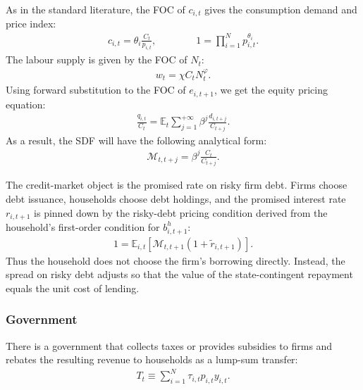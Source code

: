 \documentclass[12pt]{article}
\numberwithin{equation}{section}
\begin{document}
As in the standard literature, the FOC of $c_{i,t}$ gives the consumption demand and price index:
\begin{align*}
    c_{i,t}
    =
    \theta_i\frac{C_t}{p_{i,t}},
    \qquad \qquad
    1
    =
    \prod_{i=1}^N p_{i,t}^{\theta_i}.
\end{align*}
The labour supply is given by the FOC of $N_t$:
\begin{align*}
    w_t = \chi C_t N_t^{\varphi}.
\end{align*}
Using forward substitution to the FOC of $e_{i,t+1}$, we get the equity pricing equation:
\begin{align*}
    \frac{q_{i,t}}{C_t} = \mathbb{E}_t \sum_{j=1}^{+\infty} \beta^j \frac{d_{i,t+j}}{C_{t+j}}.
\end{align*}
As a result, the SDF will have the following analytical form:
\begin{align*}
    \mathcal{M}_{t, t+j} = \beta^j \frac{C_t}{C_{t+j}}.
\end{align*}

The credit-market object is the promised rate on risky firm debt. Firms choose debt issuance, households choose debt holdings, and the promised interest rate $r_{i,t+1}$ is pinned down by the risky-debt pricing condition derived from the household's first-order condition for $b^h_{i,t+1}$:
\begin{align}\label{eq:risky_debt_pricing}
    1
    =
    \mathbb{E}_{i,t}
    \left[
        \mathcal M_{t,t+1}
        (1+\tilde r_{i,t+1})
    \right].
\end{align}
Thus the household does not choose the firm's borrowing directly. Instead, the spread on risky debt adjusts so that the value of the state-contingent repayment equals the unit cost of lending.

\subsubsection{Government}
There is a government that collects taxes or provides subsidies to firms and rebates the resulting revenue to households as a lump-sum transfer:
\begin{align*}
    T_t
    \equiv
    \sum_{i=1}^{N}
        \tau_{i,t}p_{i,t}y_{i,t}.
\end{align*}








\clearpage


\end{document}
